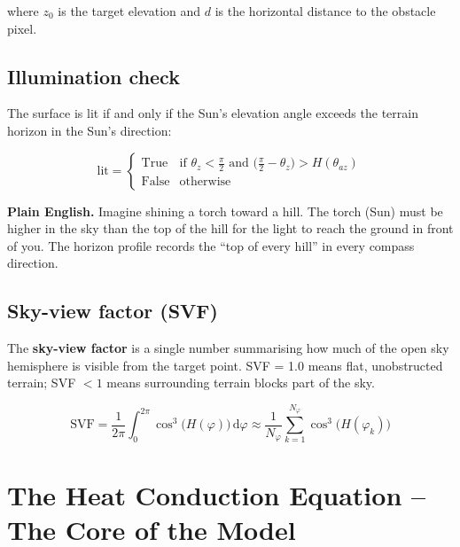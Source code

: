 \documentclass[12pt, a4paper]{article}
\begin{document}
where $z_0$ is the target elevation and $d$ is the horizontal
distance to the obstacle pixel.

\subsection{Illumination check}

The surface is lit if and only if the Sun's elevation angle
exceeds the terrain horizon in the Sun's direction:

\begin{equation}
  \text{lit} =
  \begin{cases}
    \mathrm{True}  &
      \text{if } \theta_z < \tfrac{\pi}{2}
      \text{ and }
      \bigl(\tfrac{\pi}{2} - \theta_z\bigr) > H(\theta_{az}) \\[4pt]
    \mathrm{False} & \text{otherwise}
  \end{cases}
  \label{eq:illumination}
\end{equation}

\begin{plainbox}
  \textbf{Plain English.}
  Imagine shining a torch toward a hill.
  The torch (Sun) must be higher in the sky than the top of the
  hill for the light to reach the ground in front of you.
  The horizon profile records the ``top of every hill'' in every
  compass direction.
\end{plainbox}

\subsection{Sky-view factor (SVF)}

The \textbf{sky-view factor} is a single number summarising how
much of the open sky hemisphere is visible from the target point.
SVF = 1.0 means flat, unobstructed terrain; SVF $< 1$ means
surrounding terrain blocks part of the sky.

\begin{equation}
  \mathrm{SVF}
  = \frac{1}{2\pi}\int_0^{2\pi}\cos^3\!\bigl(H(\varphi)\bigr)\,
    \mathrm{d}\varphi
  \approx
  \frac{1}{N_{\varphi}}\sum_{k=1}^{N_{\varphi}}
    \cos^3\!\bigl(H(\varphi_k)\bigr)
  \label{eq:svf}
\end{equation}

\section{The Heat Conduction Equation -- The Core of the Model}
\end{document}
